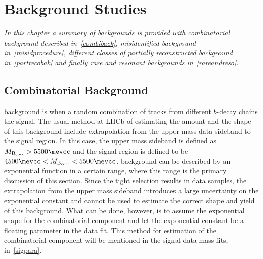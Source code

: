 \chapter{Background Studies}
\label{chap:back}


\textit{In this chapter a summary of \DIFdelbegin {}\DIFdelend \DIFaddbegin {}\DIFaddend backgrounds is provided with \DIFaddbegin {}\DIFaddend combinatorial background described in~\autoref{combiback}, misidentified background in~\autoref{misidprocedure}, different classes of partially reconstructed background in~\autoref{partrecobak} and finally rare and resonant backgrounds in~\autoref{rareandreso}.}

\section{Combinatorial Background}
\label{combiback}
\DIFdelbegin {}\DIFdelend \DIFaddbegin {}\DIFaddend background is when a random combination of tracks from different $b$-decay chains \DIFdelbegin {}\DIFdelend \DIFaddbegin {}\DIFaddend the signal. The usual method at \gls{LHCb} of estimating the amount and the shape of this background include extrapolation from the upper mass data sideband to the signal region. In this case, the upper mass sideband is defined as $M_{\rm{B_{corr}}} > 5500 \mevcc$ and the signal region is defined to be $ 4500 \mevcc <M_{\rm{B_{corr}}} < 5500 \mevcc$. \DIFdelbegin {}\DIFdelend \DIFaddbegin {}\DIFaddend background can be described by an exponential function in a certain range, where this range is the primary discussion of this section. Since the tight selection results in \DIFdelbegin {}\DIFdelend \DIFaddbegin {}\DIFaddend data samples, the extrapolation from the upper mass sideband introduces a large uncertainty on the exponential constant and cannot be used to estimate the correct shape and yield of this background. What can be done, however, is to assume the exponential shape for the combinatorial component and let the exponential constant be a floating parameter in the data fit. This method for estimation of the combinatorial component will be mentioned in the signal data mass fits, in~\autoref{sigpara}. 

